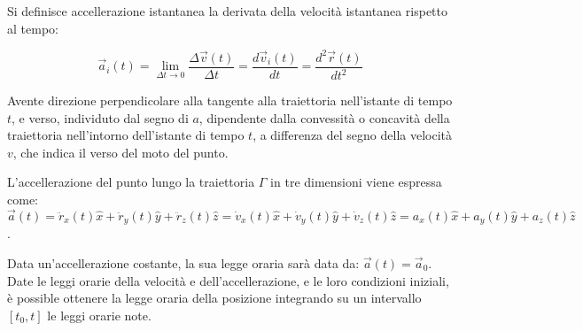 \documentclass{article}
\numberwithin{equation}{subsection}
\begin{document}
Si definisce accellerazione istantanea la derivata della velocità istantanea rispetto al tempo: 

\begin{equation}
    \vec{a}_i(t) = \lim_{\Delta t \to 0}\displaystyle\frac{\Delta\vec{v}(t)}{\Delta t} = \displaystyle\frac{d\vec{v}_i(t)}{dt} = \displaystyle\frac{d^{2}\vec{r}(t)}{dt^{2}}
\end{equation}

Avente direzione perpendicolare alla tangente alla 
traiettoria nell'istante di tempo $t$, e verso, individuto dal segno di $a$, dipendente dalla convessità o concavità della traiettoria
nell'intorno dell'istante di tempo $t$, a differenza del segno della velocità $v$, che indica il verso 
del moto del punto.  


L'accellerazione del punto lungo la traiettoria $\Gamma$ in tre dimensioni viene espressa come:
$\vec{a}(t) = \ddot{r}_x(t)\hat{x} +\ddot{r}_y(t)\hat{y} +\ddot{r}_z(t)\hat{z} = \dot{v}_x(t)\hat{x} + \dot{v}_y(t)\hat{y} + \dot{v}_z(t)\hat{z} = a_x(t)\hat{x} +a_y(t)\hat{y} + a_z(t)\hat{z}$.

\begin{center}\end{center}

Data un'accellerazione costante, la sua legge oraria sarà data 
da: $\vec{a}(t) = \vec{a}_0$. 
Date le leggi orarie della velocità e dell'accellerazione, e le loro condizioni iniziali, è possible ottenere la legge 
oraria della posizione integrando su un intervallo $[t_0,t]$ le leggi orarie note. 
\end{document}
